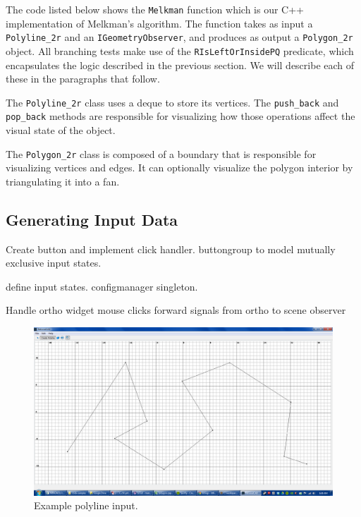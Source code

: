 The code listed below shows the \texttt{Melkman} function which is our C++
implementation of Melkman's algorithm. The function takes as input a
\texttt{Polyline\_2r} and an \texttt{IGeometryObserver}, and produces as output
a \texttt{Polygon\_2r} object. All branching tests make use of the
\texttt{RIsLeftOrInsidePQ} predicate, which encapsulates the logic described in
the previous section. We will describe each of these in the paragraphs that
follow.
 
 

The \texttt{Polyline\_2r} class uses a deque to store its vertices. The
\texttt{push\_back} and \texttt{pop\_back} methods are responsible for
visualizing how those operations affect the visual state of the object.





The \texttt{Polygon\_2r} class is composed of a  boundary
that is responsible for visualizing vertices and edges. It can optionally
visualize the polygon interior by triangulating it into a fan.  

  
 
\subsection{Generating Input Data} 

Create button and implement click handler. buttongroup to model mutually
exclusive input states.

define input states. configmanager singleton. 


Handle ortho widget mouse clicks
forward signals from ortho to scene observer

\begin{figure}[h]
	\centering
	\includegraphics[width=\textwidth]{figures/melkman-input-1}
	\caption{Example polyline input.}
	\label{fig:melkman-input}
\end{figure}




